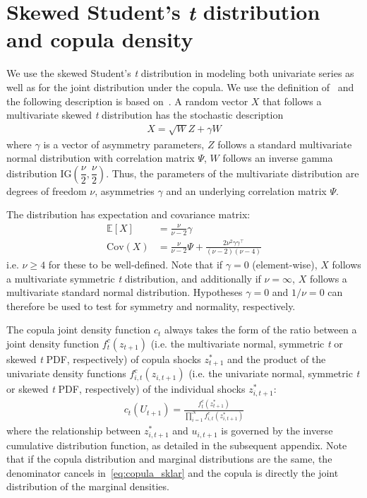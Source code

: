 
\section{Skewed Student's \emph{t} distribution and copula density} %
\label{app:ghstmv}

We use the skewed Student's \emph{t} distribution in modeling both univariate series as well as for the joint distribution under the copula. We use the definition of~\textcite{Hansen1994} and the following description is based on~\textcite{ChristoffersenLanglois2013}. A random vector $X$ that follows a multivariate skewed \emph{t} distribution has the stochastic description
\begin{align}
  X = \sqrt{W}Z + \gamma W
\end{align}
where $\gamma$ is a vector of asymmetry parameters, $Z$ follows a standard multivariate normal distribution with correlation matrix $\Psi$, $W$ follows an inverse gamma distribution $\text{IG}(\dfrac{\nu}{2}, \dfrac{\nu}{2})$. Thus, the parameters of the multivariate distribution are degrees of freedom $\nu$, asymmetries $\gamma$ and an underlying correlation matrix $\Psi$.

The distribution has expectation and covariance matrix:
\begin{align}
  \mathbb{E}[X] &= \frac{\nu}{\nu - 2} \gamma \\
  \text{Cov}(X) &=
    \frac{\nu}{\nu - 2} \Psi +
    \frac{2 \nu^2 \gamma \gamma^\top}{(\nu - 2)(\nu - 4)}
\end{align}
i.e. $\nu \geq 4$ for these to be well-defined. Note that if $\gamma = 0$ (element-wise), $X$ follows a multivariate symmetric \emph{t} distribution, and additionally if $\nu = \infty$, $X$ follows a multivariate standard normal distribution. Hypotheses $\gamma = 0$ and $1/\nu = 0$ can therefore be used to test for symmetry and normality, respectively.


The copula joint density function $c_t$ always takes the form of the ratio between a joint density function $f^c_{t}(z_{t+1})$ (i.e. the multivariate normal, symmetric \emph{t} or skewed \emph{t} PDF, respectively) of copula shocks $z_{t+1}^*$ and the product of the univariate density functions $f^c_{i,t}(z_{i,t+1})$ (i.e. the univariate normal, symmetric \emph{t} or skewed \emph{t} PDF, respectively) of the individual shocks $z_{i,t+1}^*$:
\begin{align}
  c_t(U_{t+1}) = 
    \frac{f^c_t(z^*_{t+1})}{\prod_{i=1}^N f^c_{i,t}(z^*_{i,t+1})}
\end{align}
where the relationship between $z^*_{i,t+1}$ and $u_{i,t+1}$ is governed by the inverse cumulative distribution function, as detailed in the subsequent appendix. Note that if the copula distribution and marginal distributions are the same, the denominator cancels in~\autoref{eq:copula_sklar} and the copula is directly the joint distribution of the marginal densities.

